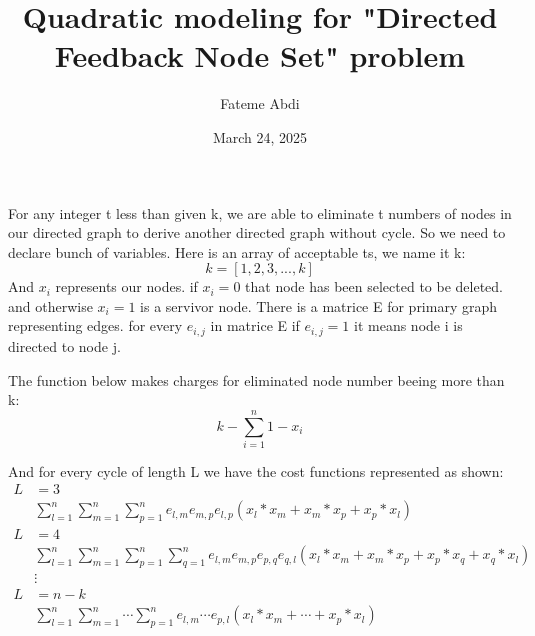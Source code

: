 \documentclass[fleqn]{article}
\begin{document}
\title{Quadratic modeling for "Directed Feedback Node Set" problem}
\author{Fateme Abdi}
\date{March 24, 2025}
\maketitle

For any integer t less than given k, we are able to eliminate t numbers of nodes in our directed graph to derive another directed graph without cycle.
So we need to declare bunch of variables.
Here is an array of acceptable ts, we name it k:
$$
k = [1, 2, 3, ... , k]
$$
And $x_i$ represents our nodes. if $x_i = 0$ that node has been selected to be deleted. and otherwise $x_i = 1$ is a servivor node.
There is a matrice E for primary graph representing edges. for every $e_{i,j}$ in matrice E if $e_{i,j} = 1$ it means node i is directed to node j.

The function below makes charges for eliminated node number beeing more than k:
\begin{equation}
k - \sum_{i=1}^{n} 1-x_i
\end{equation}

And for every cycle of length L we have the cost functions represented as shown:
\begin{align}
L&=3 \\
&\sum_{l=1}^{n}\sum_{m=1}^{n}\sum_{p=1}^{n} e_{l,m}e_{m,p}e_{l,p}(x_l*x_m+x_m*x_p+x_p*x_l)  \\
L&=4 \\
&\sum_{l=1}^{n}\sum_{m=1}^{n}\sum_{p=1}^{n}\sum_{q=1}^{n} e_{l,m}e_{m,p}e_{p,q}e_{q,l}(x_l *x_m +x_m * x_p +x_p *x_q +x_q *x_l) \\
&\vdots \\
L&=n-k \\ 
&\sum_{l=1}^{n}\sum_{m=1}^{n} \cdots \sum_{p=1}^{n} e_{l,m} \cdots e_{p,l}(x_l*x_m+ \cdots + x_p*x_l)
\end{align}
\end{document}

